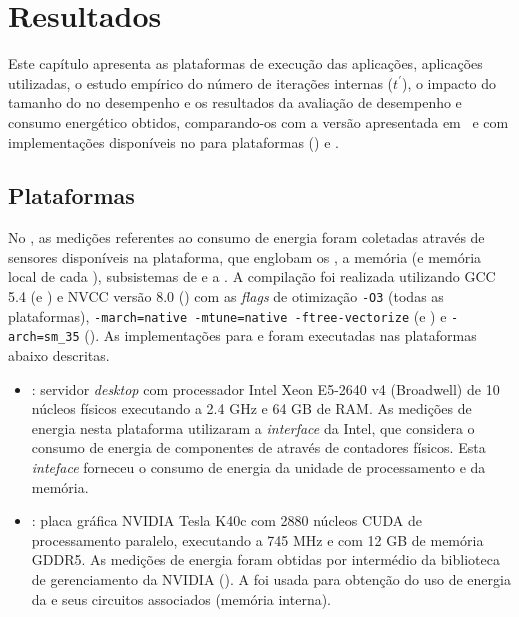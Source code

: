%

\chapter{Resultados}
\label{cap:resultados}

Este capítulo apresenta as plataformas de execução das aplicações, aplicações utilizadas, o estudo empírico do número de iterações internas ($t^\prime$), o impacto do tamanho do \tile no desempenho e os resultados da avaliação de desempenho e consumo energético obtidos, comparando-os com a versão \ipc apresentada em~\cite{Podesta:TCC} e com implementações disponíveis no \pskel para plataformas \multicore (\cpu) e \gpu.

\section{Plataformas}
\label{sec:plataformas}

No \mppa, as medições referentes ao consumo de energia foram coletadas através de sensores disponíveis na plataforma, que englobam os \clusters, a memória (\lpddr e memória local de cada \cluster), subsistemas de \io e a \noc. A compilação foi realizada utilizando GCC 5.4 (\mppa e \cpu) e NVCC versão 8.0 (\gpu) com as \textit{flags} de otimização \texttt{-O3} (todas as plataformas), \texttt{-march=native -mtune=native -ftree-vectorize} (\cpu e \gpu) e \texttt{-arch=sm\_35} (\gpu). As implementações para \cpu e \gpu foram executadas nas plataformas abaixo descritas.

\begin{itemize}

  \item \textbf{\xeon}: servidor \textit{desktop} com processador Intel Xeon E5-2640 v4 (Broadwell) de 10 núcleos físicos executando a 2.4 GHz e 64 GB de RAM. As medições de energia nesta plataforma utilizaram a \textit{interface} \rapl da Intel, que considera o consumo de energia de componentes de \hw através de contadores físicos. Esta \textit{inteface} forneceu o consumo de energia da unidade de processamento e da memória.

  \item \textbf{\tesla}: placa gráfica NVIDIA Tesla K40c com 2880 núcleos CUDA de processamento paralelo, executando a 745 MHz e com 12 GB de memória GDDR5. As medições de energia foram obtidas por intermédio da biblioteca de gerenciamento da NVIDIA (\nvml). A \nvml foi usada para obtenção do uso de energia da \gpu e seus circuitos associados (\eg memória interna).

\end{itemize}

